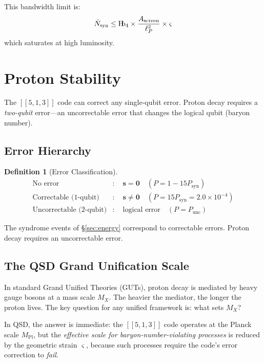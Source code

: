 \documentclass[11pt,a4paper]{article}
\theoremstyle{definition}
\newtheorem{definition}[theorem]{Definition}
\theoremstyle{remark}
\newcommand{\Hb}{\textnormal{H\kern-0.3em b}}
\newcommand{\Hbfour}{\Hb_4}
\newcommand{\strain}{\varsigma}
\newcommand{\Mpl}{M_{\mathrm{Pl}}}
\newcommand{\Psyn}{P_{\mathrm{syn}}}
\newcommand{\Punc}{P_{\mathrm{unc}}}
\begin{document}
This bandwidth limit is:
\begin{equation}
\dot{N}_{\mathrm{syn}} \leq \Hbfour \times \frac{A_{\mathrm{screen}}}{\ell_P^2} \times \strain
\end{equation}
which saturates at high luminosity.

\section{Proton Stability}
\label{sec:proton}

The $[[5,1,3]]$ code can correct any single-qubit error. Proton decay requires a \emph{two-qubit} error---an uncorrectable error that changes the logical qubit (baryon number).

\subsection{Error Hierarchy}

\begin{definition}[Error Classification]
\begin{align}
\text{No error} &: \quad \mathbf{s} = \mathbf{0} \quad (P = 1 - 15\Psyn) \\
\text{Correctable (1-qubit)} &: \quad \mathbf{s} \neq \mathbf{0} \quad (P = 15 \Psyn = 2.0 \times 10^{-4}) \\
\text{Uncorrectable (2-qubit)} &: \quad \text{logical error} \quad (P = \Punc)
\end{align}
\end{definition}

The syndrome events of \S\ref{sec:energy} correspond to correctable errors. Proton decay requires an uncorrectable error.

\subsection{The QSD Grand Unification Scale}

In standard Grand Unified Theories (GUTs), proton decay is mediated by heavy gauge bosons at a mass scale $M_X$. The heavier the mediator, the longer the proton lives. The key question for any unified framework is: what sets $M_X$?

In QSD, the answer is immediate: the $[[5,1,3]]$ code operates at the Planck scale $\Mpl$, but the \emph{effective scale for baryon-number-violating processes} is reduced by the geometric strain $\strain$, because such processes require the code's error correction to \emph{fail}.
\end{document}
